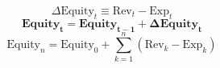 \begin{equation}
    \Delta \text{Equity}_t \equiv \text{Rev}_t - \text{Exp}_t
\end{equation}
\begin{equation}
    \mathbf{\text{Equity}_t = \text{Equity}_{t-1} + \Delta \text{Equity}_t}
\end{equation}
\begin{equation}
    \text{Equity}_n = \text{Equity}_0 + \sum_{k=1}^n (\text{Rev}_k - \text{Exp}_k)
\end{equation}
